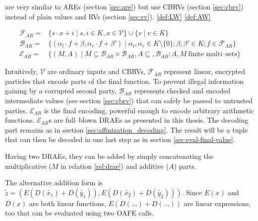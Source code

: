 
are very similar to AREs
(section \ref{sec:are}) but use CBRVs (section \ref{sec:cbrv}) instead of plain
values and RVs (section \ref{sec:rv}). \ref{def:LW} \ref{def:AW}

\begin{align}
  \mathcal{F}_{AR} = & \{ s \cdot x + i \mid s, i \in K, x \in \mathcal{V} \}
  \cup \{ v \mid v \in K \} \\
%
  \mathcal{B}_{AR} = & \{ (\alpha_l \cdot f + \beta, \alpha_r \cdot f + \beta' )
  \mid \alpha_l, \alpha_r \in K \setminus \{0\}; \beta, \beta' \in K; f \in
  \mathcal{F}_{AR} \} \\
%
  \label{rel:drae}
  \mathcal{E}_{AR} = & \{ (M, A) \mid
    M \subseteq \mathcal{B}_{AR} \times \mathcal{B}_{AR},
    A \subseteq, \mathcal{B}_{AR};
    A, M~\text{finite multi--sets} \}
%
\end{align}

\noindent Intuitively, $\mathcal{V}$ are ordinary inputs and CBRVs,
$\mathcal{F}_{AR}$ represent linear, encrypted particles that encode parts of
the final function. To prevent illegal information gaining by a corrupted second
party, $\mathcal{B}_{AR}$ represents checked and encoded intermediate values
(see section \ref{sec:cbrv}) that can safely be passed to untrusted parties.
$\mathcal{E}_{AR}$ is the final encoding, powerful enough to encode arbitrary
arithmetic functions. $\mathcal{E}_{AR}$s are full--blown DRAEs as presented in
this thesis. The decoding part remains as in section
\ref{sec:affinization_decoding}. The result will be a tuple that can then be
decoded in one last step as in section \ref{sec:eval-final-value}.


\label{sec:encode-drae}


Having two DRAEs, they can be added by simply concatenating the multiplicative
($M$ in relation \ref{rel:drae}) and additive ($A$) parts.



The alternative addition form is
$\widetilde{z} =
\left( E\left(D(\widetilde{x_1}) + D(\widetilde{y_1})\right),
       E\left(D(\widetilde{x_2}) + D(\widetilde{y_2})\right)
\right)$.
Since $E(x)$ and $D(x)$ are both linear functions,
$E\left(D(\ldots) +D(\ldots)\right)$
are linear expressions, too that can be evaluated using two OAFE calls.



